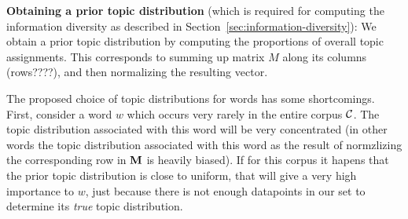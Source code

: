 \documentclass{article} %
\begin{document}
{\bf Obtaining a prior topic distribution} (which is
required for computing the information diversity as described in Section~\ref{sec:information-diversity}): We obtain a prior
 topic distribution by computing the proportions of overall topic
 assignments. This corresponds to summing up matrix $M$ along its
 columns (rows????), and then normalizing the resulting vector.

The proposed choice of topic distributions for words has some
shortcomings. First, consider a word $w$ which occurs very rarely
in the entire corpus ${\mathcal C}$. The topic distribution associated with this word
will be very concentrated (in other words the topic distribution associated with this word as the result of normzlizing the corresponding row in $\operatorname{\mathbf{M}}$ is heavily biased). 
If  for this corpus it hapens that the prior topic distribution is close to uniform, that will give a very high importance to $w$, just because
there is not enough datapoints in our set to determine its {\em true}
topic distribution. 




\end{document}
